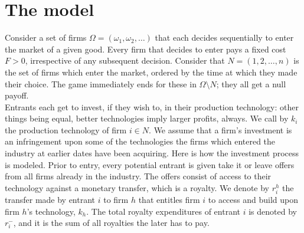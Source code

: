 \documentclass{article}
\begin{document}
\section{The model}
Consider a set of firms $\Omega=(\omega_1,\omega_2,\ldots)$ that each decides sequentially to enter the market of a given good. Every firm that decides to enter pays a fixed cost $F>0$, irrespective of any subsequent decision. Consider that $N=(1,2,\ldots,n)$ is the set of firms which enter the market, ordered by the time at which they made their choice. The game immediately ends for these in $\Omega\setminus N$; they all get a null payoff. \\
\indent Entrants each get to invest, if they wish to, in their production technology: other things being equal, better technologies imply larger profits, always. We call by $k_i$ the production technology of firm $i\in N$. We assume that a firm's investment is an infringement upon some of the technologies the firms which entered the industry at earlier dates have been acquiring. Here is how the investment process is modeled. Prior to entry, every potential entrant is given take it or leave offers from all firms already in the industry. The offers consist of access to their technology against a monetary transfer, which is a royalty. We denote by $r^{h}_i$ the transfer made by entrant $i$ to firm $h$ that entitles firm $i$ to access and build upon firm $h$'s technology, $k_h$. The total royalty expenditures of entrant $i$ is denoted by $r^-_i$, and it is the sum of all royalties the later has to pay.\\
\end{document}
